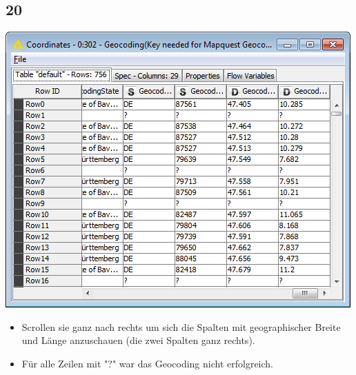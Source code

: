 \documentclass{beamer}
\begin{document}
\subsection{20}
\begin{frame}
	\begin{center}
  		\includegraphics[height=0.6\textheight]{20.png}
	\end{center}
	\begin{itemize}
		\item Scrollen sie ganz nach rechts um sich die Spalten mit geographischer Breite und Länge anzuschauen (die zwei Spalten ganz rechts).
		\item Für alle Zeilen mit "?" war das Geocoding nicht erfolgreich.
	\end{itemize}
\end{frame}
\end{document}
